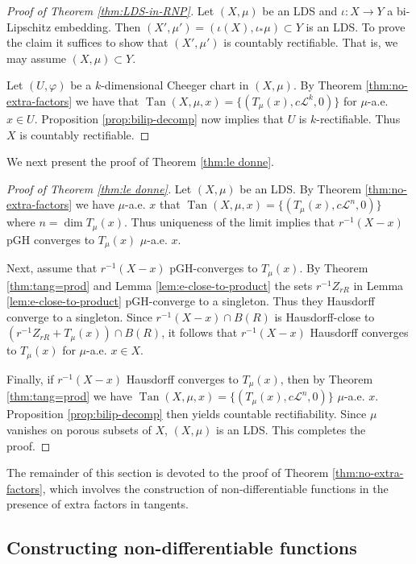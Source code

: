 \documentclass{amsart}
\numberwithin{equation}{section}
\newcommand{\leb}{\mathcal{L}}
\newcommand{\inv}{^{-1}}
\newcommand{\Tan}{\operatorname{Tan}}
\begin{document}
\begin{proof}[Proof of Theorem \ref{thm:LDS-in-RNP}]
Let $(X,\mu)$ be an LDS and $\iota:X\to Y$ a bi-Lipschitz embedding. 
Then $(X',\mu')=(\iota(X),\iota_\ast\mu)\subset Y$ is an LDS. To prove the claim it suffices to show that $(X',\mu')$ is countably rectifiable. That is, we may assume $(X,\mu)\subset Y$. 

Let $(U,\varphi)$ be a $k$-dimensional Cheeger chart in $(X,\mu)$. By Theorem \ref{thm:no-extra-factors} we have that $\Tan(X,\mu,x)=\{(T_\mu(x),c\leb^k,0)\}$ for $\mu$-a.e. $x\in U$. Proposition \ref{prop:bilip-decomp} now implies that $U$ is $k$-rectifiable. Thus $X$ is countably rectifiable.
\end{proof}

We next present the proof of Theorem \ref{thm:le donne}.

\begin{proof}[Proof of Theorem \ref{thm:le donne}]
Let $(X,\mu)$ be an LDS. By Theorem \ref{thm:no-extra-factors} we have $\mu$-a.e. $x$ that $\Tan(X,\mu,x)=\{(T_\mu(x),c\leb^n,0)\}$ where $n=\dim T_\mu(x)$. Thus uniqueness of the limit implies that $r\inv(X-x)$ pGH converges to $T_\mu(x)$ $\mu$-a.e. $x$. 

Next, assume that $r\inv(X-x)$ pGH-converges to $T_\mu(x)$. By Theorem \ref{thm:tang=prod} and Lemma \ref{lem:e-close-to-product} the sets $r\inv Z_{rR}$ in Lemma \ref{lem:e-close-to-product} pGH-converge to a singleton. Thus they Hausdorff converge to a singleton. Since $r\inv(X-x)\cap B(R)$ is Hausdorff-close to $(r\inv Z_{rR}+T_\mu (x))\cap B(R)$, it follows that $r\inv(X-x)$ Hausdorff converges to $T_\mu(x)$ for $\mu$-a.e. $x\in X$.

Finally, if $r\inv(X-x)$ Hausdorff converges to $T_\mu(x)$, then by Theorem \ref{thm:tang=prod} we have $\Tan(X,\mu,x)=\{(T_\mu(x),c\leb^n,0)\}$ $\mu$-a.e. $x$. Proposition \ref{prop:bilip-decomp} then yields countable rectifiability. Since $\mu$ vanishes on porous subsets of $X$, $(X,\mu)$ is an LDS. This completes the proof.
\end{proof}

The remainder of this section is devoted to the proof of Theorem \ref{thm:no-extra-factors}, which involves the construction of non-differentiable functions in the presence of extra factors in tangents. 



\subsection{Constructing non-differentiable functions}\label{sec:non-diff}
\end{document}
